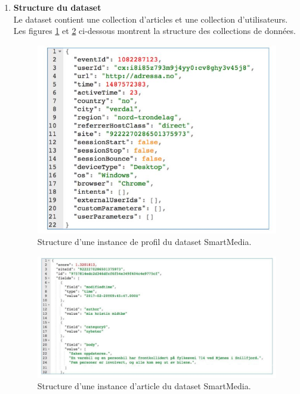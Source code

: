     \begin{enumerate}[leftmargin=*]
        \item\textbf{Structure du dataset}\\
        Le dataset contient une collection d'articles et une collection d'utilisateurs. Les figures \ref{instance-profil} et \ref{instance-article} ci-dessous montrent la structure des collections de données.
        \begin{figure}[H]
            \centering
            \includegraphics[width=350pt]{img/chapter4/smartmedia/structure_profil.jpg}
            \caption{Structure d'une instance de profil du dataset SmartMedia.}
            \label{instance-profil}
        \end{figure}
        
        \begin{figure}[H]
            \centering
            \includegraphics[width=410pt]{img/chapter4/smartmedia/structure.png}
            \caption{Structure d'une instance d'article du dataset SmartMedia.}
            \label{instance-article}
        \end{figure}


\end{enumerate}
